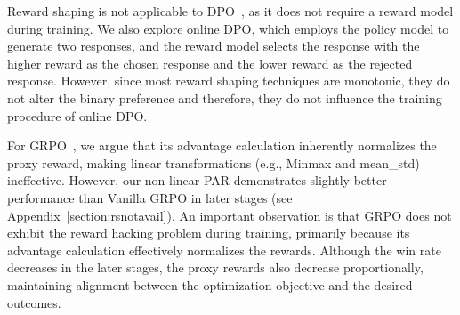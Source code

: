 Reward shaping is not applicable to DPO~\cite{DPO}, as it does not require a reward model during training. We also explore online DPO, which employs the policy model to generate two responses, and the reward model selects the response with the higher reward as the chosen response and the lower reward as the rejected response. However, since most reward shaping techniques are monotonic, they do not alter the binary preference and therefore, they do not influence the training procedure of online DPO.

For GRPO~\cite{shao2024deepseekmathpushinglimitsmathematical}, we argue that its advantage calculation inherently normalizes the proxy reward, making linear transformations (e.g., Minmax and mean\_std) ineffective. However, our non-linear PAR demonstrates slightly better performance than Vanilla GRPO in later stages (see Appendix~\ref{section:rsnotavail}).
An important observation is that GRPO does not exhibit the reward hacking problem during training, primarily because its advantage calculation effectively normalizes the rewards. Although the win rate decreases in the later stages, the proxy rewards also decrease proportionally, maintaining alignment between the optimization objective and the desired outcomes.